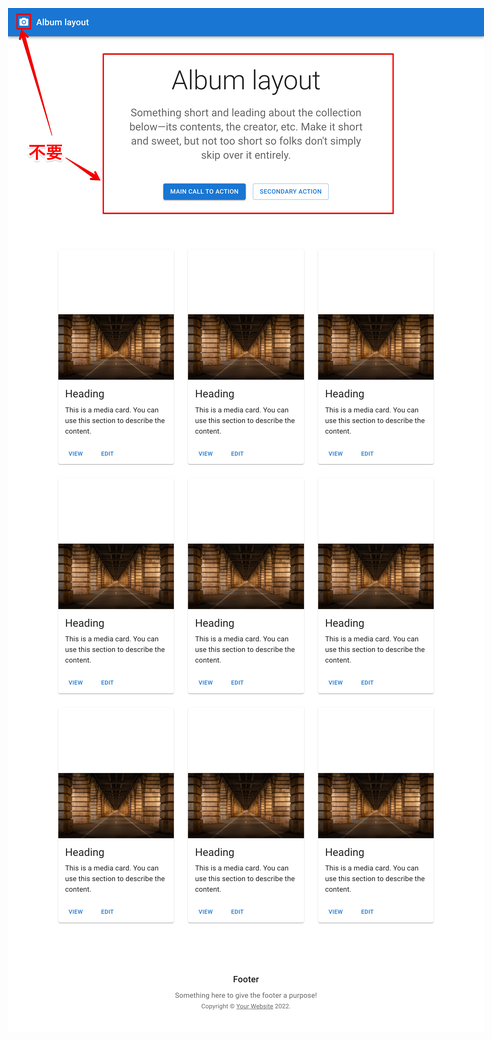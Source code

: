 \begin{reviewimage}[H]%
\includegraphics[width=0.6\maxwidth]{./images/03-todo-with-react/mui005-albumLayout.png}%
\label{image:03-todo-with-react:mui005-albumLayout}
\end{reviewimage}

